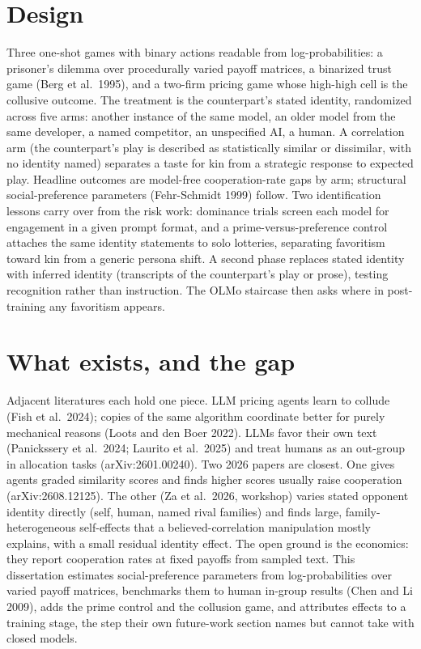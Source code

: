 \documentclass[10pt]{article}
\begin{document}
\section{Design}
Three one-shot games with binary actions readable from log-probabilities: a prisoner's dilemma over procedurally varied payoff matrices, a binarized trust game (Berg et al.\ 1995), and a two-firm pricing game whose high-high cell is the collusive outcome. The treatment is the counterpart's stated identity, randomized across five arms: another instance of the same model, an older model from the same developer, a named competitor, an unspecified AI, a human. A correlation arm (the counterpart's play is described as statistically similar or dissimilar, with no identity named) separates a taste for kin from a strategic response to expected play. Headline outcomes are model-free cooperation-rate gaps by arm; structural social-preference parameters (Fehr-Schmidt 1999) follow. Two identification lessons carry over from the risk work: dominance trials screen each model for engagement in a given prompt format, and a prime-versus-preference control attaches the same identity statements to solo lotteries, separating favoritism toward kin from a generic persona shift. A second phase replaces stated identity with inferred identity (transcripts of the counterpart's play or prose), testing recognition rather than instruction. The OLMo staircase then asks where in post-training any favoritism appears.

\section{What exists, and the gap}
Adjacent literatures each hold one piece. LLM pricing agents learn to collude (Fish et al.\ 2024); copies of the same algorithm coordinate better for purely mechanical reasons (Loots and den Boer 2022). LLMs favor their own text (Panickssery et al.\ 2024; Laurito et al.\ 2025) and treat humans as an out-group in allocation tasks (arXiv:2601.00240). Two 2026 papers are closest. One gives agents graded similarity scores and finds higher scores usually raise cooperation (arXiv:2608.12125). The other (Za et al.\ 2026, workshop) varies stated opponent identity directly (self, human, named rival families) and finds large, family-heterogeneous self-effects that a believed-correlation manipulation mostly explains, with a small residual identity effect. The open ground is the economics: they report cooperation rates at fixed payoffs from sampled text. This dissertation estimates social-preference parameters from log-probabilities over varied payoff matrices, benchmarks them to human in-group results (Chen and Li 2009), adds the prime control and the collusion game, and attributes effects to a training stage, the step their own future-work section names but cannot take with closed models.
\end{document}
